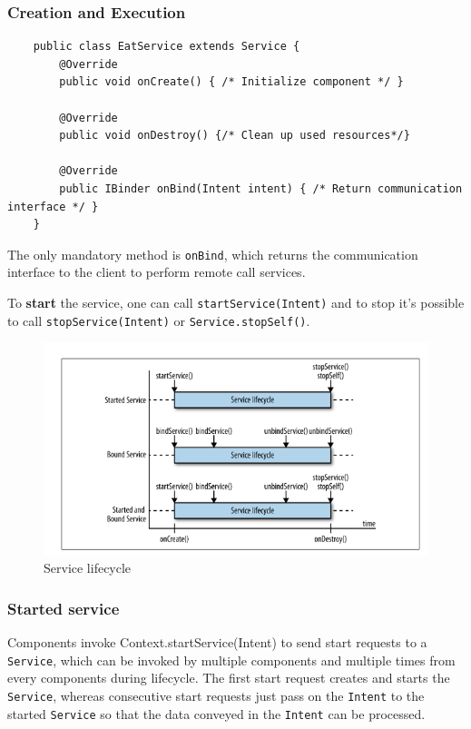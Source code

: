 \subsubsection{Creation and Execution}

\begin{lstlisting}
    public class EatService extends Service {
        @Override
        public void onCreate() { /* Initialize component */ }
        
        @Override 
        public void onDestroy() {/* Clean up used resources*/} 

        @Override
        public IBinder onBind(Intent intent) { /* Return communication interface */ } 
    }
\end{lstlisting}

The only mandatory method is \texttt{onBind}, which returns the communication 
interface to the client to perform remote call services. 

To \textbf{start} the service, one can call \texttt{startService(Intent)} and to stop 
it's possible to call \texttt{stopService(Intent)} or \texttt{Service.stopSelf()}. 


\begin{figure}[h]
\centering
\includegraphics[width=1\linewidth]{figures/06_service_lifecycle.png}
\caption{Service lifecycle}
\label{fig:service_lifecycle}
\end{figure}

\subsubsection{Started service}
Components invoke Context.startService(Intent) to send start requests to a \texttt{Service},
which can be invoked by multiple components and multiple times from every components during 
lifecycle. The first start request creates and starts the \texttt{Service}, whereas consecutive
start requests just pass on the \texttt{Intent} to the started \texttt{Service} so that the
data conveyed in the \texttt{Intent} can be processed. 

